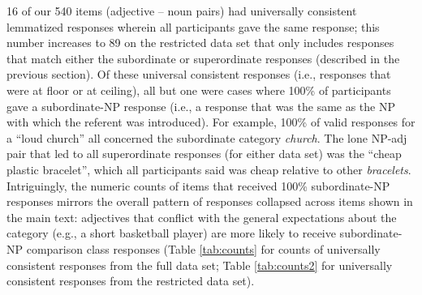 \documentclass[doc]{apa6}
\begin{document}
16 of our 540 items (adjective -- noun pairs) had universally consistent lemmatized responses wherein all participants gave the same response; this number increases to 89 on the restricted data set that only includes responses that match either the subordinate or superordinate responses (described in the previous section). 
Of these universal consistent responses (i.e., responses that were at floor or at ceiling), all but one were cases where 100\% of participants gave a subordinate-NP response (i.e., a response that was the same as the NP with which the referent was introduced). 
For example, 100\% of valid responses for a ``loud church'' all concerned the subordinate category \emph{church}. 
The lone NP-adj pair that led to all superordinate responses (for either data set) was the ``cheap plastic bracelet'', which all participants said was cheap relative to other \emph{bracelets}. 
Intriguingly, the numeric counts of items that received 100\% subordinate-NP responses mirrors the overall pattern of responses collapsed across items shown in the main text: adjectives that conflict with the general expectations about the category (e.g., a short basketball player) are more likely to receive subordinate-NP comparison class responses (Table \ref{tab:counts} for counts of universally consistent responses from the full data set; Table \ref{tab:counts2} for universally consistent responses from the restricted data set). 
\end{document}
